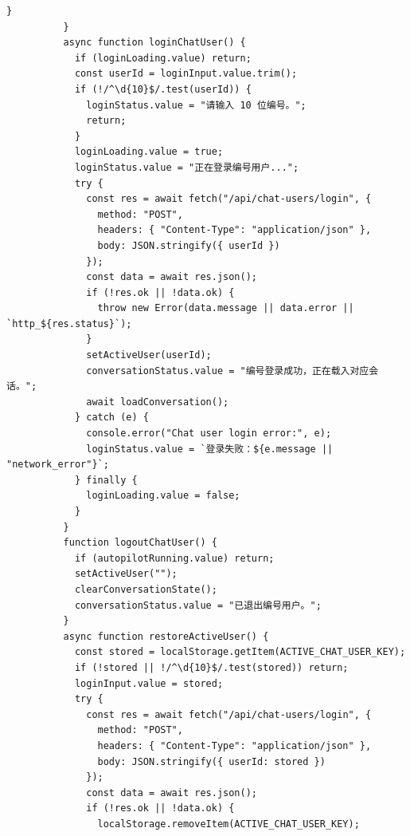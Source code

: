 \documentclass[12pt,a4paper]{article}
\begin{document}
\begin{Verbatim}[fontsize=\footnotesize]
            }
          }
          async function loginChatUser() {
            if (loginLoading.value) return;
            const userId = loginInput.value.trim();
            if (!/^\d{10}$/.test(userId)) {
              loginStatus.value = "请输入 10 位编号。";
              return;
            }
            loginLoading.value = true;
            loginStatus.value = "正在登录编号用户...";
            try {
              const res = await fetch("/api/chat-users/login", {
                method: "POST",
                headers: { "Content-Type": "application/json" },
                body: JSON.stringify({ userId })
              });
              const data = await res.json();
              if (!res.ok || !data.ok) {
                throw new Error(data.message || data.error || `http_${res.status}`);
              }
              setActiveUser(userId);
              conversationStatus.value = "编号登录成功，正在载入对应会话。";
              await loadConversation();
            } catch (e) {
              console.error("Chat user login error:", e);
              loginStatus.value = `登录失败：${e.message || "network_error"}`;
            } finally {
              loginLoading.value = false;
            }
          }
          function logoutChatUser() {
            if (autopilotRunning.value) return;
            setActiveUser("");
            clearConversationState();
            conversationStatus.value = "已退出编号用户。";
          }
          async function restoreActiveUser() {
            const stored = localStorage.getItem(ACTIVE_CHAT_USER_KEY);
            if (!stored || !/^\d{10}$/.test(stored)) return;
            loginInput.value = stored;
            try {
              const res = await fetch("/api/chat-users/login", {
                method: "POST",
                headers: { "Content-Type": "application/json" },
                body: JSON.stringify({ userId: stored })
              });
              const data = await res.json();
              if (!res.ok || !data.ok) {
                localStorage.removeItem(ACTIVE_CHAT_USER_KEY);
\end{Verbatim}
\newpage
{}
\fancyhead[R]{}
\end{document}
